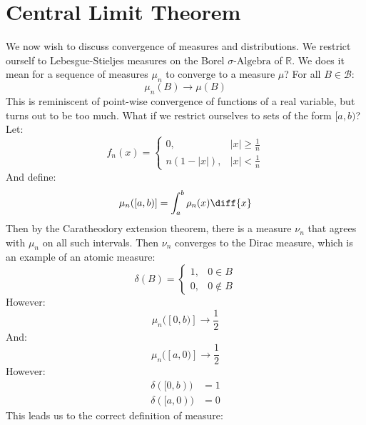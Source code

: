 \section{Central Limit Theorem}
    We now wish to discuss convergence of measures and
    distributions. We restrict ourself to
    Lebesgue-Stieljes measures on the Borel
    $\sigma\textrm{-Algebra}$ of $\mathbb{R}$. We does it
    mean for a sequence of measures $\mu_{n}$ to converge
    to a measure $\mu$? For all $B\in\mathcal{B}$:
    \begin{equation}
        \mu_{n}(B)\rightarrow\mu(B)
    \end{equation}
    This is reminiscent of point-wise convergence of functions
    of a real variable, but turns out to be too much. What if
    we restrict ourselves to sets of the form $[a,b)$? Let:
    \begin{equation}
        f_{n}(x)=
            \begin{cases}
                0,&|x|\geq\frac{1}{n}\\
                n(1-|x|),&|x|<\frac{1}{n}
            \end{cases}
    \end{equation}
    And define:
    \begin{equation}
        \mu_{n}([a,b)]=\int_{a}^{b}\rho_{n}(x)\diff{x}
    \end{equation}
    Then by the Caratheodory extension theorem, there is a
    measure $\nu_{n}$ that agrees with $\mu_{n}$ on all
    such intervals. Then $\nu_{n}$ converges to the
    Dirac measure, which is an example of an atomic measure:
    \begin{equation}
        \delta(B)=
            \begin{cases}
                1,&0\in{B}\\
                0,&0\notin{B}
            \end{cases}
    \end{equation}
    However:
    \begin{equation}
        \mu_{n}([0,b)]\rightarrow\frac{1}{2}
    \end{equation}
    And:
    \begin{equation}
        \mu_{n}([a,0)]\rightarrow\frac{1}{2}
    \end{equation}
    However:
    \begin{align}
        \delta([0,b))&=1\\
        \delta([a,0))&=0
    \end{align}
    This leads us to the correct definition of measure:

